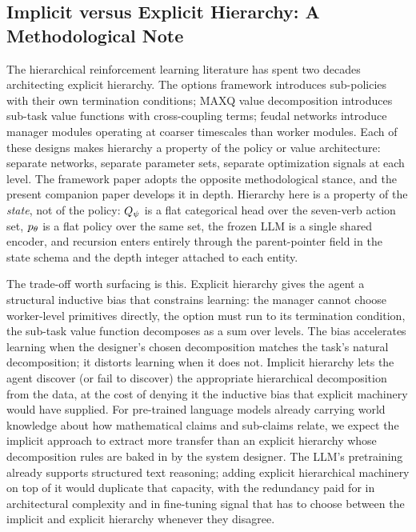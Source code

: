 \subsection{Implicit versus Explicit Hierarchy: A Methodological Note}
\label{sec:disc-implicit}

The hierarchical reinforcement learning literature has spent two decades
architecting explicit hierarchy. The options framework
\citep{sutton1999between} introduces sub-policies with their own
termination conditions; MAXQ value decomposition
\citep{dietterich2000hierarchical} introduces sub-task value functions
with cross-coupling terms; feudal networks \citep{vezhnevets2017feudal}
introduce manager modules operating at coarser timescales than worker
modules. Each of these designs makes hierarchy a property of the policy
or value architecture: separate networks, separate parameter sets,
separate optimization signals at each level. The framework paper adopts
the opposite methodological stance, and the present companion paper
develops it in depth. Hierarchy here is a property of the \emph{state},
not of the policy: $Q_{\psi}$ is a flat categorical head over the
seven-verb action set, $p_{\theta}$ is a flat policy over the same set, the
frozen LLM is a single shared encoder, and recursion enters entirely
through the parent-pointer field in the state schema and the depth
integer attached to each entity.

The trade-off worth surfacing is this. Explicit hierarchy gives the
agent a structural inductive bias that constrains learning: the manager
cannot choose worker-level primitives directly, the option must run to
its termination condition, the sub-task value function decomposes as a
sum over levels. The bias accelerates learning when the designer's
chosen decomposition matches the task's natural decomposition; it
distorts learning when it does not. Implicit hierarchy lets the agent
discover (or fail to discover) the appropriate hierarchical decomposition
from the data, at the cost of denying it the inductive bias that
explicit machinery would have supplied. For pre-trained language models
already carrying world knowledge about how mathematical claims and
sub-claims relate, we expect the implicit approach to extract more
transfer than an explicit hierarchy whose decomposition rules are baked
in by the system designer. The LLM's pretraining already supports
structured text reasoning; adding explicit hierarchical machinery on top
of it would duplicate that capacity, with the redundancy paid for in
architectural complexity and in fine-tuning signal that has to choose
between the implicit and explicit hierarchy whenever they disagree.

